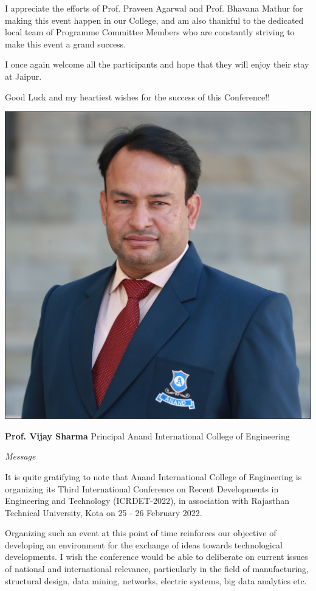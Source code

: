 \documentclass[twoside,11pt]{amsart}
\begin{document}
I appreciate the efforts of Prof. Praveen Agarwal and Prof. Bhavana Mathur for
making this event happen in our College, and am also thankful to the dedicated
local team of Programme Committee Members who are constantly striving to
make this event a grand success.

I once again welcome all the participants and hope that they will enjoy their stay
at Jaipur.

Good Luck and my heartiest wishes for the success of this Conference!!
\vskip 5mm
\newpage
\begin{flushright}
\includegraphics[height=8\baselineskip]{PP}
\end{flushright}
\vskip 1mm
\hfill \textbf{ Prof. Vijay Sharma}
\vskip 1mm
\hfill Principal
\vskip 1mm
\hfill Anand International College of Engineering
\vskip 10mm
\centerline {\huge{\emph{Message}}}
\vskip 10mm
It is quite gratifying to note that Anand International College of Engineering is organizing its Third International Conference on Recent Developments in Engineering and Technology (ICRDET-2022), in association with Rajasthan Technical University, Kota on 25 - 26 February 2022.

Organizing such an event at this point of time reinforces our objective of developing an environment for the exchange of ideas towards technological developments. I wish the conference would be able to deliberate on current issues of national and international relevance, particularly in the field of manufacturing, structural design, data mining, networks, electric systems, big data analytics etc.
\end{document}
